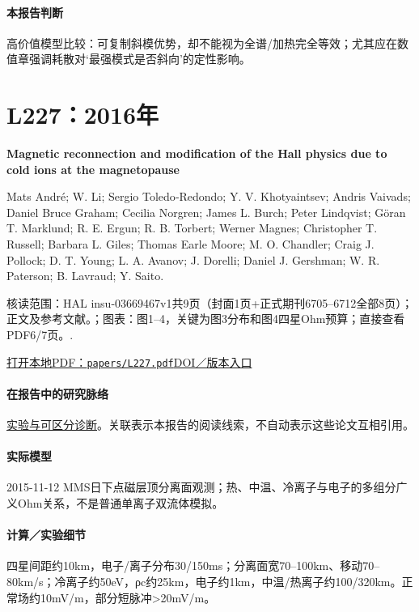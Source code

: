 \documentclass[UTF8,a4paper,11pt,openany,fontset=fandol]{ctexbook}
\begin{document}
\paragraph{本报告判断}高价值模型比较：可复制斜模优势，却不能视为全谱/加热完全等效；尤其应在数值章强调耗散对‘最强模式是否斜向’的定性影响。

\section{L227：2016年}\label{paper:L227}

\textbf{Magnetic reconnection and modification of the Hall physics due to cold ions at the magnetopause}\citep{L227}\

Mats André;  W. Li;  Sergio Toledo‐Redondo;  Y. V. Khotyaintsev;  Andris Vaivads;  Daniel Bruce Graham;  Cecilia Norgren;  James L. Burch;  Peter Lindqvist;  Göran T. Marklund;  R. E. Ergun;  R. B. Torbert;  Werner Magnes;  Christopher T. Russell;  Barbara L. Giles;  Thomas Earle Moore;  M. O. Chandler;  Craig J. Pollock;  D. T. Young;  L. A. Avanov;  J. Dorelli;  Daniel J. Gershman;  W. R. Paterson;  B. Lavraud;  Y. Saito.

\textsf{核读范围：}HAL insu-03669467v1共9页（封面1页+正式期刊6705–6712全部8页）；正文及参考文献。；\textsf{图表：}图1–4，关键为图3分布和图4四星Ohm预算；直接查看PDF6/7页。.

\href{run:../papers/L227.pdf}{打开本地PDF：\texttt{papers/L227.pdf}}\quad\href{https://doi.org/10.1002/2016gl069665}{DOI／版本入口}

\paragraph{在报告中的研究脉络}\hyperref[story:diagnostic]{实验与可区分诊断}。关联表示本报告的阅读线索，不自动表示这些论文互相引用。

\paragraph{实际模型}2015-11-12 MMS日下点磁层顶分离面观测；热、中温、冷离子与电子的多组分广义Ohm关系，不是普通单离子双流体模拟。

\paragraph{计算／实验细节}四星间距约10km，电子/离子分布30/150ms；分离面宽70–100km、移动70–80km/s；冷离子约50eV，ρc约25km，电子约1km，中温/热离子约100/320km。正常场约10mV/m，部分短脉冲>20mV/m。
\end{document}
